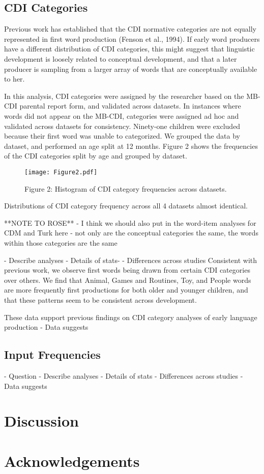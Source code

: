 \documentclass[10pt,letterpaper]{article}
\begin{document}
\subsection{CDI Categories} 
Previous work has established that the CDI normative categories are not equally represented in first word production (Fenson et al., 1994). If early word producers have a different distribution of CDI categories, this might suggest that linguistic development is loosely related to conceptual development, and that a later producer is sampling from a larger array of words that are conceptually available to her.\par
In this analysis, CDI categories were assigned by the researcher based on the MB-CDI parental report form, and validated across datasets. In instances where words did not appear on the MB-CDI,  categories were assigned ad hoc and validated across datasets for consistency. Ninety-one children were excluded because their first word was unable to categorized. We grouped the data by dataset, and performed an age split at 12 months. Figure 2 shows the frequencies of the CDI categories split by age and grouped by dataset.
\begin{figure}[t]
\begin{center}
\texttt{[image: Figure2.pdf]}
\end{center}
\caption{Figure 2: Histogram of CDI category frequencies across datasets.}
\end{figure}

Distributions of CDI category frequency across all 4 datasets almost identical. 

**NOTE TO ROSE** - I think we should also put in the word-item analyses for CDM and Turk here - not only are the conceptual categories the same, the words within those categories are the same

- Describe analyses
- Details of stats- 
- Differences across studies
Consistent with previous work, we observe first words being drawn from certain CDI categories over others. We find that Animal, Games and Routines, Toy, and People words are more frequently first productions for both older and younger children, and that these patterns seem to be consistent across development. \par
These data support previous findings on CDI category analyses of early language production 
- Data suggests

\subsection{Input Frequencies}
- Question
- Describe analyses
- Details of stats
- Differences across studies
- Data suggests

\section{Discussion}

\section{Acknowledgements}
\end{document}
